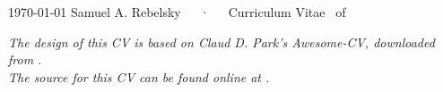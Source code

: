 \documentclass[11pt,letterpaper]{samr-cv}
\begin{document}

\begingroup
\renewcommand{\bibitem}[1]{}%
\endgroup

\vspace{-0.5in}
\makecvheader

\makecvfooter
  {\today}
  {Samuel A. Rebelsky~~~·~~~Curriculum Vitae}
  {\thepage\ of \pageref{LastPage}}











\vfill
\vhrulefill{0.1mm}
\begin{center}
\fontsize{8pt}{1em}\bodyfont\itshape\color{lighttext} The design of this CV is based on Claud D. Park's Awesome-CV, downloaded from
. \\
 The source for this CV can be found online at . \\
\end{center}
\end{document}
